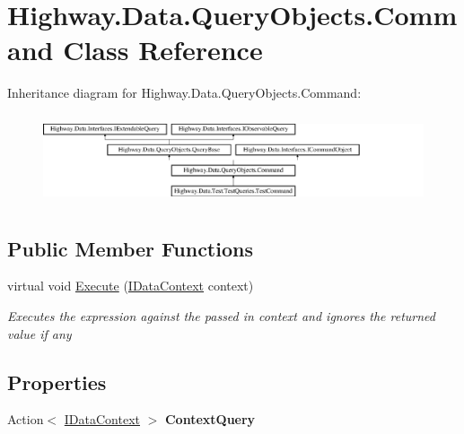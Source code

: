 \hypertarget{class_highway_1_1_data_1_1_query_objects_1_1_command}{\section{Highway.\-Data.\-Query\-Objects.\-Command Class Reference}
\label{class_highway_1_1_data_1_1_query_objects_1_1_command}
}


 


Inheritance diagram for Highway.\-Data.\-Query\-Objects.\-Command\-:\begin{figure}[H]
\begin{center}
\leavevmode
\includegraphics[height=2.666667cm]{class_highway_1_1_data_1_1_query_objects_1_1_command}
\end{center}
\end{figure}
\subsection*{Public Member Functions}
\begin{DoxyCompactItemize}
\item 
virtual void \hyperlink{class_highway_1_1_data_1_1_query_objects_1_1_command_a7154a6a32966d8f54a31860d8c829820}{Execute} (\hyperlink{interface_highway_1_1_data_1_1_interfaces_1_1_i_data_context}{I\-Data\-Context} context)
\begin{DoxyCompactList}\small\item\em Executes the expression against the passed in context and ignores the returned value if any \end{DoxyCompactList}\end{DoxyCompactItemize}
\subsection*{Properties}
\begin{DoxyCompactItemize}
\item 
\hypertarget{class_highway_1_1_data_1_1_query_objects_1_1_command_a83c9845e7df1f9ff350d05182c23e373}{Action$<$ \hyperlink{interface_highway_1_1_data_1_1_interfaces_1_1_i_data_context}{I\-Data\-Context} $>$ {\bfseries Context\-Query}}\label{class_highway_1_1_data_1_1_query_objects_1_1_command_a83c9845e7df1f9ff350d05182c23e373}

\end{DoxyCompactItemize}

